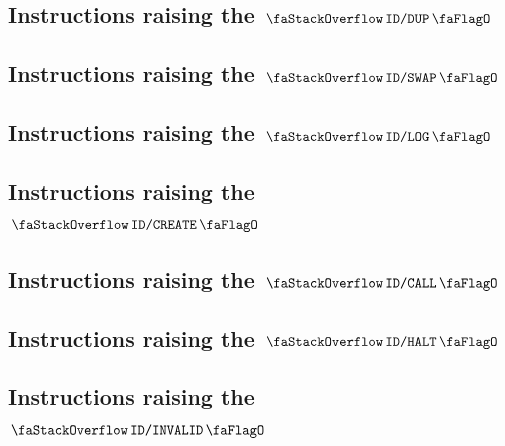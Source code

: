 \subsection{Instructions raising the $\stackDecDupFlag$           \lispDone{}}   \label{hub: instruction handling: dup}                    
\subsection{Instructions raising the $\stackDecSwapFlag$          \lispDone{}}   \label{hub: instruction handling: swap}                   
\subsection{Instructions raising the $\stackDecLogFlag$           \lispDone{}}   \label{hub: instruction handling: log}                    
\subsection{Instructions raising the $\stackDecCreateFlag$        \lispDone{}}   \label{hub: instruction handling: create}                 
\subsection{Instructions raising the $\stackDecCallFlag$          \lispDone{}}   \label{hub: instruction handling: call}                   
\subsection{Instructions raising the $\stackDecHaltFlag$          \lispDone{}}   \label{hub: instruction handling: halt}                   
\subsection{Instructions raising the $\stackDecInvalidFlag$       \lispDone{}}   \label{hub: instruction handling: invalid}                
